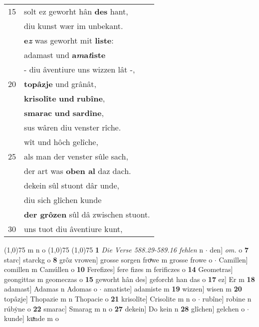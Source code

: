 \documentclass[8pt,a4paper,notitlepage]{article}
\begin{document}
\begin{table}[ht]
\begin{minipage}[t]{0.5\linewidth}
\begin{tabular}{rl}
15 & solt ez geworht hân \textbf{des} hant,\\ 
 & diu kunst wær im unbekant.\\ 
 & \textbf{e\textit{z}} was geworht mit \textbf{liste}:\\ 
 & adamast und \textbf{a\textit{m}a\textit{t}iste}\\ 
 & - diu âventiure uns wizzen lât -,\\ 
20 & \textbf{topâzje} und grânât,\\ 
 & \textbf{krisolîte} \textbf{und} \textbf{rubîne},\\ 
 & \textbf{smarac} \textbf{und} \textbf{sardîne},\\ 
 & sus wâren diu venster rîche.\\ 
 & wît und hôch gelîche,\\ 
25 & als man der venster sûle sach,\\ 
 & der art was \textbf{oben al} daz dach.\\ 
 & dekein sûl stuont dâr unde,\\ 
 & diu sich glîchen kunde\\ 
 & \textbf{der grôzen} sûl dâ zwischen stuont.\\ 
30 & uns tuot diu âventiure kunt,\\ 
\end{tabular}
\scriptsize
\line(1,0){75} \newline
m n o \newline
\line(1,0){75} \newline
\newline
\line(1,0){75} \newline
\textbf{1} \textit{Die Verse 588.29-589.16 fehlen} n   $\cdot$ den] \textit{om.} o \textbf{7} starc] starckg o \textbf{8} grôz vrowen] grosse sorgen froͯwe m grosse frowe o  $\cdot$ Camillen] comillen m Camúllen o \textbf{10} Ferefizes] fere fizes m ferificzes o \textbf{14} Geometras] geongittas m geomeczas o \textbf{15} geworht hân des] geforcht han das o \textbf{17} ez] Er m \textbf{18} adamast] Adamas n Adomas o  $\cdot$ amatiste] adamiste m \textbf{19} wizzen] wisen m \textbf{20} topâzje] Thopazie m n Thopacie o \textbf{21} krisolîte] Crisolite m n o  $\cdot$ rubîne] robine n rúbẏne o \textbf{22} smarac] Smarag m n o \textbf{27} dekein] Do kein n \textbf{28} glîchen] gelchen o  $\cdot$ kunde] kuͯnde m o \newline
\end{minipage}
\end{table}
\newpage
\end{document}
